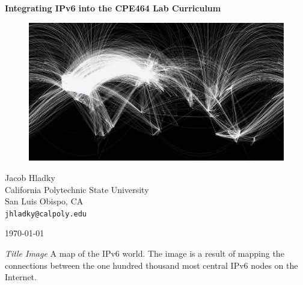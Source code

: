 \documentclass[12pt]{article}
\begin{document}
\begin{titlepage}
  \begin{center}
    \vspace*{1cm}
    \huge\textbf{{Integrating IPv6 into the CPE464 Lab Curriculum}}

    \vspace{1.5cm}

    \begin{figure}[ht!]
      \includegraphics[width=1\textwidth]{internet_map.png}
      \label{fig:internet_map}
    \end{figure}

    \vfill
    \large{
      Jacob Hladky\\
      California Polytechnic State University\\
      San Luis Obispo, CA\\
      \texttt{jhladky@calpoly.edu}
    }

    \vspace{1cm}

    \today   
  \end{center}
\end{titlepage}


\tableofcontents

\listoffigures
\bigskip
\begin{hangparas}{1.35in}{1}
\hspace{0.25in}\textit{Title Image} \hspace{0.25in} A map of the IPv6 world. The image is a result of mapping the connections between the one hundred thousand most central IPv6 nodes on the Internet.
\end{hangparas}

\begingroup
\let\clearpage\relax
\listoftables
\endgroup
\clearpage
\end{document}
